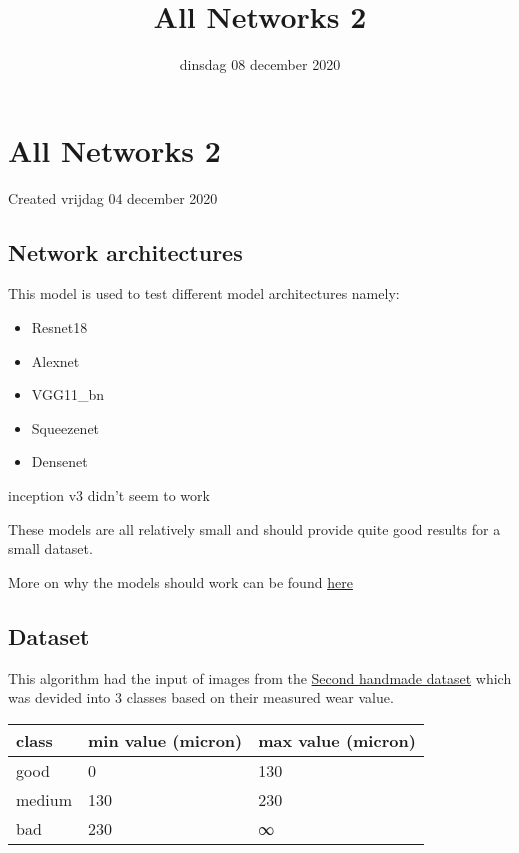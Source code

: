 \documentclass{scrartcl}
\title{All Networks 2}
\date{dinsdag 08 december 2020}
\author{}
\begin{document}
\maketitle

		\section{All Networks 2}

Created vrijdag 04 december 2020



\subsection{Network architectures}

This model is used to test different model architectures namely:

\begin{itemize}
\item Resnet18
\item Alexnet
\item VGG11\_bn
\item Squeezenet
\item Densenet
\end{itemize}


inception v3 didn't seem to work



These models are all relatively small and should provide quite good results for a small dataset. 

More on why the models should work can be found \href{../../../../Research/Vision_Algorithm/camera_position_validation.tex}{here}



\subsection{Dataset}



This algorithm had the input of images from the \href{../../../Dataset/handmade_datasets/Second_handmade_dataset.tex}{Second handmade dataset} which was devided into 3 classes based on their measured wear value. 

\begin{tabular}{ |l|l|l| }
\hline
 class & min value (micron) & max value (micron) \tabularnewline
\hline
\hline
 good & 0 & 130 \tabularnewline
\hline
 medium & 130 & 230 \tabularnewline
\hline
 bad & 230 & ∞ \tabularnewline
\hline
\end{tabular}
\end{document}
